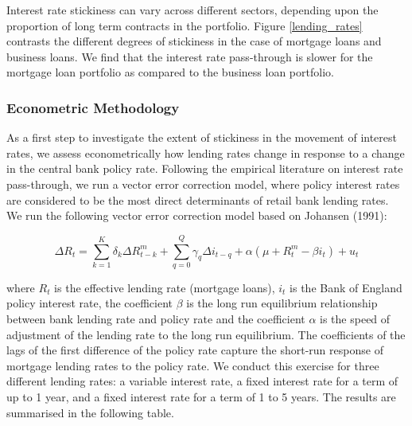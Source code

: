 \documentclass[12pt]{article}
\numberwithin{equation}{section}
\begin{document}
Interest rate stickiness can vary across different sectors, depending upon the proportion of long term contracts in the portfolio. Figure \ref{lending_rates} contrasts the different degrees of stickiness in the case of mortgage loans and business loans. We find that the interest rate pass-through is slower for the mortgage loan portfolio as compared to the business loan portfolio.

	
	


\subsubsection{Econometric Methodology}


As a first step to investigate the extent of stickiness in the movement of interest rates, we assess econometrically how lending rates change in response to a change in the central bank policy rate. Following the empirical literature on interest rate pass-through, we run a vector error correction model, where policy interest rates  are considered to be the most direct determinants of retail bank lending rates. We run the following vector error correction model based on Johansen (1991): 

\begin{equation}
{\Delta}R_{t}=\sum _{k=1}^{K }\delta_{k}{\Delta}R^m_{t-k}+\sum _{q=0}^{Q }\gamma_{q}{\Delta}i_{t-q}+\alpha (\mu+R^m_{t}-\beta i_{t})+u_{t}	
\end{equation}

where $R_{t}$ is the effective lending rate (mortgage loans), $i_{t}$ is the Bank of England policy interest rate, the coefficient $\beta$ is the long run equilibrium relationship between bank lending rate and policy rate and the coefficient $\alpha$ is the speed of adjustment of the lending rate to the long run equilibrium. The coefficients of the lags of the first difference of the policy rate capture the short-run response of mortgage lending rates to the policy rate. We conduct this exercise for three different lending rates: a variable interest rate, a fixed interest rate for a term of up to 1 year, and a fixed interest rate for a term of 1 to 5 years. The results are summarised in the following table.
\end{document}

